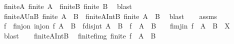\begin{isabellebody}
\ finite{\isacharunderscore}{\kern0pt}A{\isacharcolon}{\kern0pt}\ {\isachardoublequoteopen}finite\ A{\isachardoublequoteclose}\ \ finite{\isacharunderscore}{\kern0pt}B{\isacharcolon}{\kern0pt}\ {\isachardoublequoteopen}finite\ B{\isachardoublequoteclose}\ \isamarkupfalse%
\ blast{\isacharplus}{\kern0pt}\isanewline
\ \ \isamarkupfalse%
\ \isamarkupfalse%
\ finite{\isacharunderscore}{\kern0pt}A{\isacharunderscore}{\kern0pt}Un{\isacharunderscore}{\kern0pt}B{\isacharcolon}{\kern0pt}\ {\isachardoublequoteopen}finite\ {\isacharparenleft}{\kern0pt}A\ {\isasymunion}\ B{\isacharparenright}{\kern0pt}{\isachardoublequoteclose}\ \ finite{\isacharunderscore}{\kern0pt}A{\isacharunderscore}{\kern0pt}Int{\isacharunderscore}{\kern0pt}B{\isacharcolon}{\kern0pt}\ {\isachardoublequoteopen}finite\ {\isacharparenleft}{\kern0pt}A\ {\isasyminter}\ B{\isacharparenright}{\kern0pt}{\isachardoublequoteclose}\ \isamarkupfalse%
\ blast{\isacharplus}{\kern0pt}\isanewline
\ \ \isamarkupfalse%
\ assms{\isacharparenleft}{\kern0pt}{}{\isacharparenright}{\kern0pt}\ \isamarkupfalse%
\ f\ \ f{\isacharunderscore}{\kern0pt}inj{\isacharunderscore}{\kern0pt}on{\isacharcolon}{\kern0pt}\ {\isachardoublequoteopen}inj{\isacharunderscore}{\kern0pt}on\ f\ {\isacharparenleft}{\kern0pt}A\ {\isasyminter}\ B{\isacharparenright}{\kern0pt}{\isachardoublequoteclose}\ \ f{\isacharunderscore}{\kern0pt}disjnt{\isacharcolon}{\kern0pt}\ {\isachardoublequoteopen}{\isacharparenleft}{\kern0pt}A\ {\isasymunion}\ B{\isacharparenright}{\kern0pt}\ {\isasyminter}\ {\isacharparenleft}{\kern0pt}f\ {\isacharbackquote}{\kern0pt}\ {\isacharparenleft}{\kern0pt}A\ {\isasyminter}\ B{\isacharparenright}{\kern0pt}{\isacharparenright}{\kern0pt}\ {\isacharequal}{\kern0pt}\ {\isacharbraceleft}{\kern0pt}{\isacharbraceright}{\kern0pt}{\isachardoublequoteclose}\ \ f{\isacharunderscore}{\kern0pt}imj{\isacharunderscore}{\kern0pt}in{\isacharcolon}{\kern0pt}\ {\isachardoublequoteopen}f\ {\isacharbackquote}{\kern0pt}\ {\isacharparenleft}{\kern0pt}A\ {\isasyminter}\ B{\isacharparenright}{\kern0pt}\ {\isasymsubseteq}\ X{\isachardoublequoteclose}\ \isamarkupfalse%
\ blast\isanewline
\ \ \isamarkupfalse%
\ finite{\isacharunderscore}{\kern0pt}A{\isacharunderscore}{\kern0pt}Int{\isacharunderscore}{\kern0pt}B\ \isamarkupfalse%
\ finite{\isacharunderscore}{\kern0pt}f{\isacharunderscore}{\kern0pt}img{\isacharcolon}{\kern0pt}\ {\isachardoublequoteopen}finite\ {\isacharparenleft}{\kern0pt}f\ {\isacharbackquote}{\kern0pt}\ {\isacharparenleft}{\kern0pt}A\ {\isasyminter}\ B{\isacharparenright}{\kern0pt}{\isacharparenright}{\kern0pt}{\isachardoublequoteclose}\ \isamarkupfalse%

\end{isabellebody}
